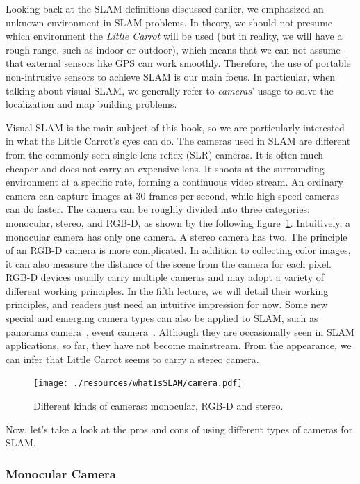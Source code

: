 Looking back at the SLAM definitions discussed earlier, we emphasized an unknown environment in SLAM problems. In theory, we should not presume which environment the \textit{Little Carrot} will be used (but in reality, we will have a rough range, such as indoor or outdoor), which means that we can not assume that external sensors like GPS can work smoothly. Therefore, the use of portable non-intrusive sensors to achieve SLAM is our main focus. In particular, when talking about visual SLAM, we generally refer to \textit{cameras}' usage to solve the localization and map building problems.

Visual SLAM is the main subject of this book, so we are particularly interested in what the Little Carrot's eyes can do. The cameras used in SLAM are different from the commonly seen single-lens reflex (SLR) cameras. It is often much cheaper and does not carry an expensive lens. It shoots at the surrounding environment at a specific rate, forming a continuous video stream. An ordinary camera can capture images at 30 frames per second, while high-speed cameras can do faster. The camera can be roughly divided into three categories: monocular, stereo, and RGB-D, as shown by the following figure~\ref{fig:cameras}. Intuitively, a monocular camera has only one camera. A stereo camera has two. The principle of an RGB-D camera is more complicated. In addition to collecting color images, it can also measure the distance of the scene from the camera for each pixel. RGB-D devices usually carry multiple cameras and may adopt a variety of different working principles. In the fifth lecture, we will detail their working principles, and readers just need an intuitive impression for now. Some new special and emerging camera types can also be applied to SLAM, such as panorama camera~\cite{Pretto2011}, event camera~\cite{Rueckauer2016}. Although they are occasionally seen in SLAM applications, so far, they have not become mainstream. From the appearance, we can infer that Little Carrot seems to carry a stereo camera.

\begin{figure}
	\centering
	\texttt{[image: ./resources/whatIsSLAM/camera.pdf]}
	\caption{Different kinds of cameras: monocular, RGB-D and stereo. }
	\label{fig:cameras}
\end{figure}

Now, let's take a look at the pros and cons of using different types of cameras for SLAM.

\subsubsection{Monocular Camera}


